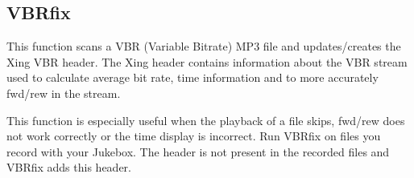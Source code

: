 \subsection{VBRfix}
This function scans a VBR (Variable Bitrate)
MP3 file and updates/creates the Xing VBR header. The Xing header
contains information about the VBR stream used to calculate average bit
rate, time information and to more accurately fwd/rew in the stream.

This function is especially useful when the playback of a file skips,
fwd/rew does not work correctly or the time display is incorrect. Run
VBRfix on files you record with your Jukebox. The header is not present
in the recorded files and VBRfix adds this header.


